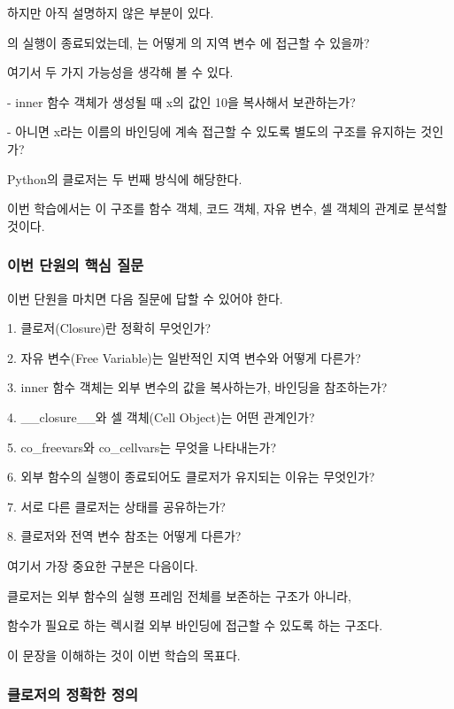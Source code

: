 하지만 아직 설명하지 않은 부분이 있다.

의 실행이 종료되었는데, 는 어떻게 의 지역 변수 에 접근할 수 있을까?

여기서 두 가지 가능성을 생각해 볼 수 있다.

\begin{dhksmry}
    - inner 함수 객체가 생성될 때
      x의 값인 10을 복사해서 보관하는가?

    - 아니면 x라는 이름의 바인딩에 계속 접근할 수 있도록
      별도의 구조를 유지하는 것인가?
\end{dhksmry}

Python의 클로저는 두 번째 방식에 해당한다.

이번 학습에서는 이 구조를 함수 객체, 코드 객체, 자유 변수, 셀 객체의 관계로 분석할 것이다.

\subsubsection{이번 단원의 핵심 질문}

이번 단원을 마치면 다음 질문에 답할 수 있어야 한다.

\begin{dhksmry}
1. 클로저(Closure)란 정확히 무엇인가?

2. 자유 변수(Free Variable)는 일반적인 지역 변수와 어떻게 다른가?

3. inner 함수 객체는 외부 변수의 값을 복사하는가,
   바인딩을 참조하는가?

4. __closure__와 셀 객체(Cell Object)는 어떤 관계인가?

5. co_freevars와 co_cellvars는 무엇을 나타내는가?

6. 외부 함수의 실행이 종료되어도 클로저가 유지되는 이유는 무엇인가?

7. 서로 다른 클로저는 상태를 공유하는가?

8. 클로저와 전역 변수 참조는 어떻게 다른가?
\end{dhksmry}

여기서 가장 중요한 구분은 다음이다.

\begin{dhksmry}[centered]
클로저는 외부 함수의 실행 프레임 전체를 보존하는 구조가 아니라,

함수가 필요로 하는 렉시컬 외부 바인딩에 접근할 수 있도록 하는 구조다.
\end{dhksmry}

이 문장을 이해하는 것이 이번 학습의 목표다.

\subsubsection{클로저의 정확한 정의}

